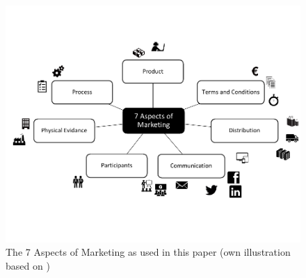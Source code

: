 \begin{figure}[H]
	\includegraphics{img/7p.pdf}
	\caption[7 Aspects of Marketing]{The 7 Aspects of Marketing as used in this paper (own illustration based on \protect\cites[285]{Thommen.2012}[397-720]{Meffert.2015}{Hoepner2015})}
	\label{fig:aspects}
\end{figure}
